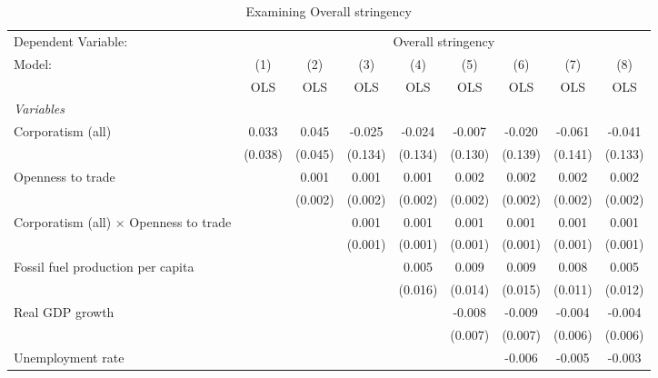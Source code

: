 
\begin{table}[htbp]
   \caption{Examining Overall stringency}
   \centering
   \begin{tabular}{lcccccccc}
      \toprule
      Dependent Variable: & \multicolumn{8}{c}{Overall stringency}\\
      Model:                                        & (1)     & (2)     & (3)     & (4)     & (5)     & (6)     & (7)     & (8)\\  
                                                    &  OLS    & OLS     & OLS     & OLS     & OLS     & OLS     & OLS     & OLS\\  
      \midrule
      \emph{Variables}\\
      Corporatism (all)                             & 0.033   & 0.045   & -0.025  & -0.024  & -0.007  & -0.020  & -0.061  & -0.041\\   
                                                    & (0.038) & (0.045) & (0.134) & (0.134) & (0.130) & (0.139) & (0.141) & (0.133)\\   
      Openness to trade                             &         & 0.001   & 0.001   & 0.001   & 0.002   & 0.002   & 0.002   & 0.002\\   
                                                    &         & (0.002) & (0.002) & (0.002) & (0.002) & (0.002) & (0.002) & (0.002)\\   
      Corporatism (all) $\times$ Openness to trade  &         &         & 0.001   & 0.001   & 0.001   & 0.001   & 0.001   & 0.001\\   
                                                    &         &         & (0.001) & (0.001) & (0.001) & (0.001) & (0.001) & (0.001)\\   
      Fossil fuel production per capita             &         &         &         & 0.005   & 0.009   & 0.009   & 0.008   & 0.005\\   
                                                    &         &         &         & (0.016) & (0.014) & (0.015) & (0.011) & (0.012)\\   
      Real GDP growth                               &         &         &         &         & -0.008  & -0.009  & -0.004  & -0.004\\   
                                                    &         &         &         &         & (0.007) & (0.007) & (0.006) & (0.006)\\   
      Unemployment rate                             &         &         &         &         &         & -0.006  & -0.005  & -0.003\\   

\end{tabular}
\end{table}
